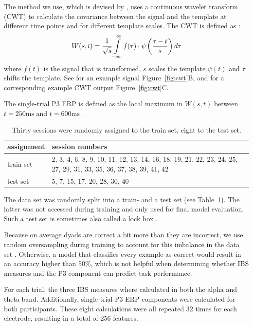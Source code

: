 The method we use, which is devised by \textcite{bostanov_recognition_2004},
uses a continuous wavelet transform (CWT) to calculate the covariance between
the signal and the template at different time points and for different template
scales. The CWT is defined as \parencite{bostanov_t-cwt_2006}:
\begin{equation}
W(s, t) = \cfrac{1}{\sqrt{s}}\int\displaylimits_{-\infty}^\infty f(\tau) \cdot \psi\left(\frac{\tau - t}{s}\right) d\tau
\end{equation}
where $f(t)$ is the signal that is transformed, $s$ scales the template
$\psi(t)$ and $\tau$ shifts the template. See for an example signal
Figure~\ref{fig:cwt}B, and for a corresponding example CWT output
Figure~\ref{fig:cwt}C.

The single-trial P3 ERP is defined as the local maximum in $W(s, t)$ between
$t=250\text{ms}$ and $t=600\text{ms}$ \parencite{jin_predicting_2019}.

\begin{table}[!htbp]
\caption{Thirty sessions were randomly assigned to the train set, eight to the test set.}
\label{tab:predictionsplit}
\begin{tabularx}{\linewidth}{l X}
  \hline
  assignment & session numbers\\\hline
  train set & 2, 3, 4, 6, 8, 9, 10, 11, 12, 13, 14, 16, 18, 19, 21, 22, 23, 24, 25, 27, 29, 31, 33, 35, 36, 37, 38, 39, 41, 42\\
  test set & 5, 7, 15, 17, 20, 28, 30, 40\\\hline
\end{tabularx}
\end{table}

The data set was randomly split into a train- and a test set
(see Table~\ref{tab:predictionsplit}). The latter was not accessed during training and only used for
final model evaluation. Such a test set is sometimes also called a lock box
\parencite{hosseini_i_2020}.

Because on average dyads are correct a bit more than they are incorrect, we use
random oversampling during training to account for this imbalance in the data
set \parencite{maimon_data_2005}. Otherwise, a model that classifies every
example as correct would result in an accuracy higher than 50\%, which is not
helpful when determining whether IBS measures and the P3 component can predict
task performance.

For each trial, the three IBS measures where calculated in both the alpha and
theta band. Additionally, single-trial P3 ERP components were calculated for
both participants. These eight calculations were all repeated 32 times for each
electrode, resulting in a total of 256 features.

